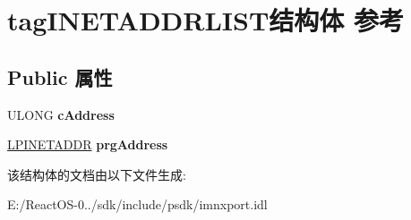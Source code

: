 \hypertarget{structtag_i_n_e_t_a_d_d_r_l_i_s_t}{}\section{tag\+I\+N\+E\+T\+A\+D\+D\+R\+L\+I\+S\+T结构体 参考}
\label{structtag_i_n_e_t_a_d_d_r_l_i_s_t}
\subsection*{Public 属性}
\begin{DoxyCompactItemize}
\item 
\mbox{\label{structtag_i_n_e_t_a_d_d_r_l_i_s_t_a93ff4c329c3922c18dc84fa4f0bd23fa}} 
U\+L\+O\+NG {\bfseries c\+Address}
\item 
\mbox{\label{structtag_i_n_e_t_a_d_d_r_l_i_s_t_a3fe54936463111382a54341656557a78}} 
\hyperlink{structtag_i_n_e_t_a_d_d_r}{L\+P\+I\+N\+E\+T\+A\+D\+DR} {\bfseries prg\+Address}
\end{DoxyCompactItemize}


该结构体的文档由以下文件生成\+:\begin{DoxyCompactItemize}
\item 
E\+:/\+React\+O\+S-\/0../sdk/include/psdk/imnxport.\+idl\end{DoxyCompactItemize}
